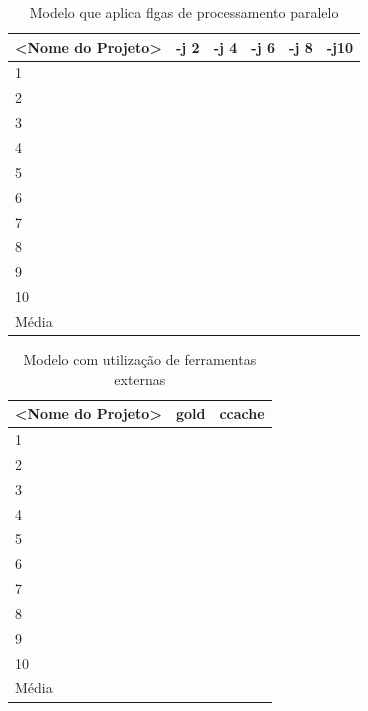 \begin{table}[!ht]
\centering
\tiny
\caption{Modelo que aplica flgas de processamento paralelo}
\label{tab:modelo_flag_processamento_paralelo}
\begin{tabular}{llllll}
\textbf{<Nome do Projeto>} & \textbf{-j 2} & \textbf{-j 4} & \textbf{-j 6} & \textbf{-j 8} & \textbf{-j10}  \\ \toprule
1                                    &    &     &     &     &        \\ 
2                                    &    &     &     &     &        \\ 
3                                    &    &     &     &     &        \\ 
4                                    &    &     &     &     &        \\ 
5                                    &    &     &     &     &        \\ 
6                                    &    &     &     &     &        \\ 
7                                    &    &     &     &     &        \\ 
8                                    &    &     &     &     &        \\ 
9                                    &    &     &     &     &        \\ 
10                                   &    &     &     &     &        \\ \bottomrule
Média                                &    &     &     &     &        \\ 
\end{tabular}
\end{table}

\begin{table}[!ht]
\centering
\tiny
\caption{Modelo com utilização de ferramentas externas}
\label{tab:modelo_ferramentas_auxliares}
\begin{tabular}{lll}
\textbf{<Nome do Projeto>} & \textbf{gold} & \textbf{ccache}   \\ \toprule
1                                    &     &        \\ 
2                                    &     &        \\ 
3                                    &     &        \\ 
4                                    &     &        \\ 
5                                    &     &        \\ 
6                                    &     &        \\ 
7                                    &     &        \\ 
8                                    &     &        \\ 
9                                    &     &        \\ 
10                                   &     &        \\ \bottomrule
Média                                &     &        \\ 
\end{tabular}
\end{table}
